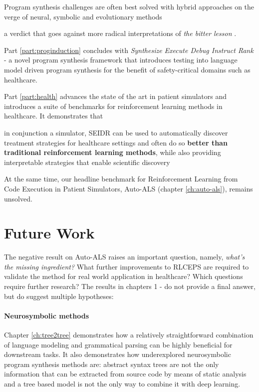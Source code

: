 \begin{highlight}
Program synthesis challenges are often best solved with hybrid approaches on the verge of neural, symbolic and evolutionary methods
\end{highlight}

a verdict that goes against more radical interpretations of \emph{the bitter lesson} \cite{BitterLesson2019, traskBitterLessonsBitter2025}.

Part \ref{part:proginduction} concludes with \emph{Synthesize Execute Debug Instruct Rank} - a novel program synthesis framework that introduces testing into language model driven program synthesis for the benefit of safety-critical domains such as healthcare.

Part \ref{part:health} advances the state of the art in patient simulators and introduces a suite of benchmarks for reinforcement learning methods in healthcare. It demonstrates that 

\begin{highlight}
in conjunction a simulator, SEIDR can be used to automatically discover treatment strategies for healthcare settings and often do so \textbf{better than traditional reinforcement learning methods}, while also providing interpretable strategies that enable scientific discovery
\end{highlight}

At the same time, our headline benchmark for Reinforcement Learning from Code Execution in Patient Simulators, Auto-ALS (chapter \ref{ch:auto-als}), remains unsolved.

\newpage
\section{Future Work}

The negative result on Auto-ALS raises an important question, namely, \emph{what's the missing ingredient?}
What further improvements to RLCEPS are required to validate the method for real world application in healthcare?
Which questions require further research?
The results in chapters 1 - \prevchap{} do not provide a final answer, but do suggest multiple hypotheses:

\paragraph{Neurosymbolic methods}

Chapter \ref{ch:tree2tree} demonstrates how a relatively straightforward combination of language modeling and grammatical parsing can be highly beneficial for downstream tasks.
It also demonstrates how underexplored neurosymbolic program synthesis methods are: abstract syntax trees are not the only information that can be extracted from source code by means of static analysis and a tree based model is not the only way to combine it with deep learning.

